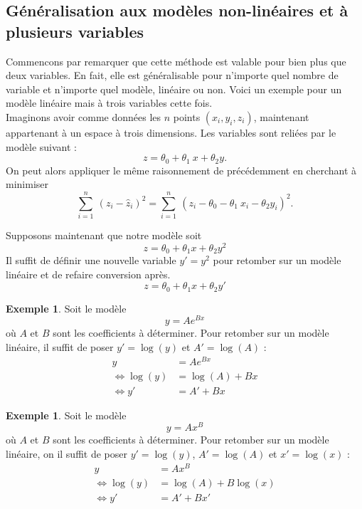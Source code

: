\documentclass[a4paper,12pt]{report}
\theoremstyle{definition}
\renewcommand{\(}{\left(}
\renewcommand{\)}{\right)}
\newtheorem{exmp}[thm]{Exemple}
\begin{document}
        \subsection{Généralisation aux modèles non-linéaires et à plusieurs variables}
        
            Commencons par remarquer que cette méthode est valable pour bien plus que deux variables. En fait, elle est généralisable pour n'importe quel nombre de variable et n'importe quel modèle, linéaire ou non. Voici un exemple pour un modèle linéaire mais à trois variables cette fois.\\
            Imaginons avoir comme données les $n$ points $(x_i,y_i,z_i)$, maintenant appartenant à un espace à trois dimensions. Les variables sont reliées par le modèle suivant :
            $$z = \theta_0+\theta_1~x+\theta_2 y.$$
            On peut alors appliquer le même raisonnement de précédemment en cherchant à minimiser
            $$\sum_{i=1}^n~(z_i-\hat{z}_i)^2 = \sum_{i=1}^n~(z_i-\theta_0-\theta_1~x_i-\theta_2 y_i)^2 .$$
            
            Supposons maintenant que notre modèle soit 
            $$z = \theta_0+\theta_1 x + \theta_2 y^2$$
            Il suffit de définir une nouvelle variable $y'=y^2$ pour retomber sur un modèle linéaire et de refaire conversion après.
            $$z = \theta_0+\theta_1 x + \theta_2 y'$$
            
            \begin{exmp}
                Soit le modèle 
                $$y = Ae^{Bx}$$
                où $A$ et $B$ sont les coefficients à déterminer. Pour retomber sur un modèle linéaire, il suffit de poser $y'=\log(y)$ et $A'=\log(A)$ :
                \begin{align*}
                    y &= Ae^{Bx} \\
                    \Leftrightarrow \log(y) &= \log(A) + Bx \\
                    \Leftrightarrow y' &= A' + Bx
                \end{align*}
            \end{exmp}
            
            \begin{exmp}
                Soit le modèle 
                $$y = Ax^B$$
                où $A$ et $B$ sont les coefficients à déterminer. Pour retomber sur un modèle linéaire, on il suffit de poser $y'=\log(y)$, $A'=\log(A)$ et $x'=\log(x)$ :
                \begin{align*}
                    y &= Ax^B \\
                    \Leftrightarrow \log(y) &= \log(A) + B\log(x) \\
                    \Leftrightarrow y' &= A' + Bx'
                \end{align*}
            \end{exmp}
            
\end{document}
